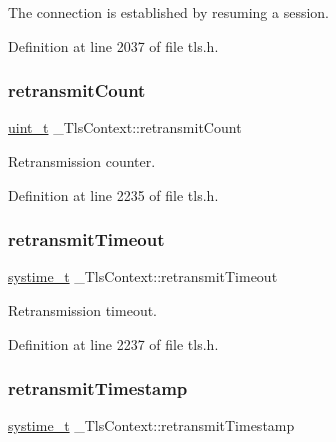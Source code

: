 The connection is established by resuming a session. 



Definition at line 2037 of file tls.\+h.

\mbox{\label{struct__TlsContext_a90e51ec3496ff9ed28c315291a459330}} 
\subsubsection{\texorpdfstring{retransmit\+Count}{retransmitCount}}
{\footnotesize\ttfamily \hyperlink{compiler__port_8h_a12a1e9b3ce141648783a82445d02b58d}{uint\+\_\+t} \+\_\+\+Tls\+Context\+::retransmit\+Count}



Retransmission counter. 



Definition at line 2235 of file tls.\+h.

\mbox{\label{struct__TlsContext_ad8fb0e3268744def35f37c07fa6d8150}} 
\subsubsection{\texorpdfstring{retransmit\+Timeout}{retransmitTimeout}}
{\footnotesize\ttfamily \hyperlink{compiler__port_8h_ae3e32a98d431a02106616da3071832dd}{systime\+\_\+t} \+\_\+\+Tls\+Context\+::retransmit\+Timeout}



Retransmission timeout. 



Definition at line 2237 of file tls.\+h.

\mbox{\label{struct__TlsContext_a4331bbb2f1761488112d356b428045d6}} 
\subsubsection{\texorpdfstring{retransmit\+Timestamp}{retransmitTimestamp}}
{\footnotesize\ttfamily \hyperlink{compiler__port_8h_ae3e32a98d431a02106616da3071832dd}{systime\+\_\+t} \+\_\+\+Tls\+Context\+::retransmit\+Timestamp}



